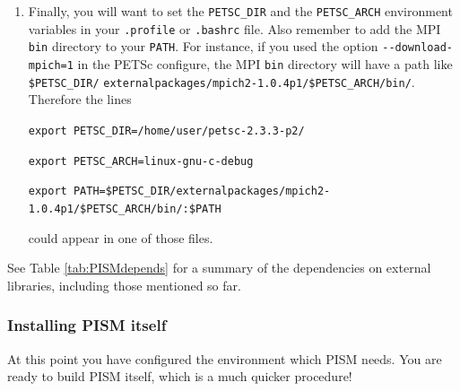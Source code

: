 \documentclass[11pt,final]{amsart}
\begin{document}
\begin{enumerate}
\begin{enumerate}
\item Finally, you will want to set the \verb|PETSC_DIR| and the \verb|PETSC_ARCH| environment variables in your \verb|.profile| or \verb|.bashrc| file.  Also remember to add the MPI \verb|bin| directory to your \verb|PATH|.  For instance, if you used the option \verb|--download-mpich=1| in the PETSc configure, the MPI \verb|bin| directory will have a path like \verb|$PETSC_DIR/| \verb|externalpackages/mpich2-1.0.4p1/$PETSC_ARCH/bin/|.  Therefore the lines 

\small
\verb|export PETSC_DIR=/home/user/petsc-2.3.3-p2/|

\verb|export PETSC_ARCH=linux-gnu-c-debug|

\verb|export PATH=$PETSC_DIR/externalpackages/mpich2-1.0.4p1/$PETSC_ARCH/bin/:$PATH|
\normalsize

\noindent could appear in one of those files.
\end{enumerate}
\end{enumerate}

\medskip
See Table \ref{tab:PISMdepends} for a summary of the dependencies on external libraries, including those mentioned so far.


\subsubsection*{Installing PISM itself}
At this point you have configured the environment which PISM needs.  You are ready to build PISM itself, which is a much quicker procedure!
\end{document}
